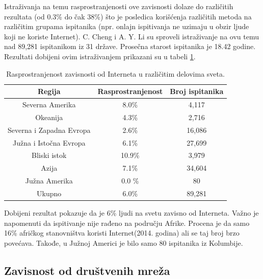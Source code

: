 \documentclass[a4paper]{article}
\begin{document}
Istraživanja na temu rasprostranjenosti ove zavisnosti dolaze do različitih rezultata (od 0.3\% do čak 38\%) što je posledica korišćenja različitih metoda na različitim grupama ispitanika (npr. onlajn ispitivanja ne uzimaju u obzir ljude koji ne koriste Internet).
C. Cheng i A. Y. Li su sproveli istraživanje na ovu temu nad 89,281 ispitanikom iz 31 države. \cite{prevalence}
Prosečna starost ispitanika je 18.42 godine.
Rezultati dobijeni ovim istraživanjem prikazani su u tabeli \ref{tab:tabela1}.

\begin{table}[h!]
\begin{center}
\caption{Rasprostranjenost zavisnosti od Interneta u različitim delovima sveta.}

\begin{tabular}{|c|c|c|} \hline
Regija& Rasprostranjenost& Broj ispitanika\\ \hline
Severna Amerika &8.0\% &4,117\\ \hline
Okeanija &4.3\% &2,716\\ \hline
Severna i Zapadna Evropa &2.6\% &16,086\\ \hline
Južna i Istočna Evropa &6.1\% &27,699\\ \hline
Bliski istok &10.9\% & 3,979\\ \hline
Azija &7.1\% &34,604\\ \hline
Južna Amerika & 0.0 \% & 80\\ \hline
Ukupno &6.0\% &89,281\\ \hline 
\end{tabular}
\label{tab:tabela1}
\end{center}
\end{table}

Dobijeni rezultat pokazuje da je 6\% ljudi na svetu zavisno od Interneta. Važno je napomenuti da ispitivanje nije rađeno na području Afrike. Procena je da samo 16\% afričkog stanovništva koristi Internet(2014. godina) ali se taj broj brzo povećava. Takođe, u Južnoj Americi je bilo samo 80 ispitanika iz Kolumbije.

\subsection{Zavisnost od društvenih mreža}
\label{subsec:podnaslovIP5}
\end{document}
